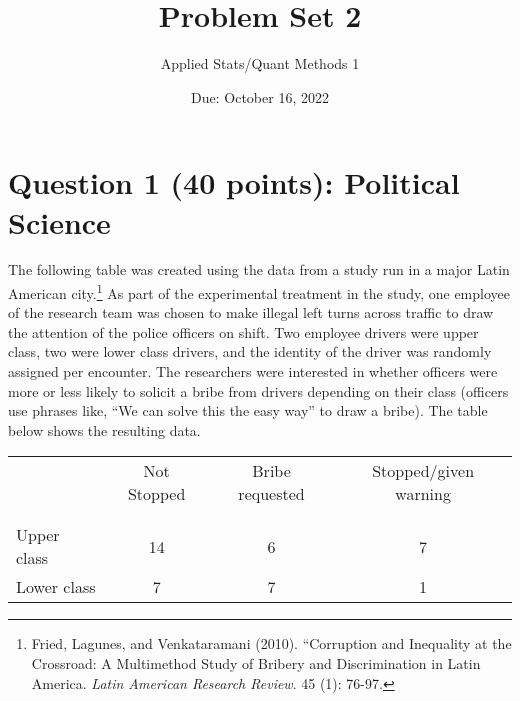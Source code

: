 \documentclass[12pt,letterpaper]{article}
\title{Problem Set 2}
\date{Due: October 16, 2022}
\author{Applied Stats/Quant Methods 1}
\begin{document}
	\maketitle
	\section*{Question 1 (40 points): Political Science}
	
	\vspace{.25cm}
	The following table was created using the data from a study run in a major Latin American city.\footnote{Fried, Lagunes, and Venkataramani (2010). ``Corruption and Inequality at the Crossroad: A Multimethod Study of Bribery and Discrimination in Latin America. \textit{Latin American Research Review}. 45 (1): 76-97.} As part of the experimental treatment in the study, one employee of the research team was chosen to make illegal left turns across traffic to draw the attention of the police officers on shift. Two employee drivers were upper class, two were lower class drivers, and the identity of the driver was randomly assigned per encounter. The researchers were interested in whether officers were more or less likely to solicit a bribe from drivers depending on their class (officers use phrases like, ``We can solve this the easy way'' to draw a bribe). The table below shows the resulting data. \\
	\vspace{3cm}
	
	\begin{table}[h!]
		\centering
		\begin{tabular}{l | c c c }
			& Not Stopped & Bribe requested & Stopped/given warning \\
			\\[-1.8ex] 
			\hline \\[-1.8ex]
			Upper class & 14 & 6 & 7 \\
			Lower class & 7 & 7 & 1 \\
			\hline
		\end{tabular}
	\end{table}
	
\end{document}

